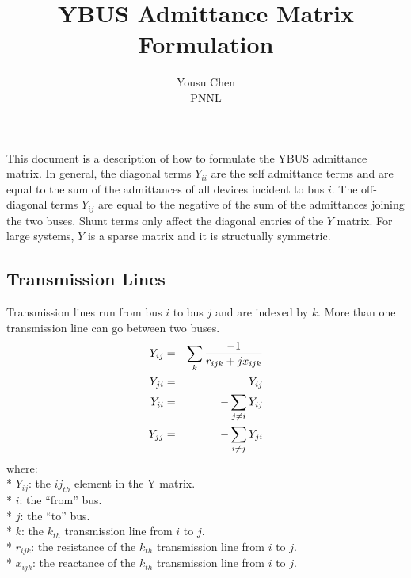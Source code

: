 \documentclass[12pt]{article}
\begin{document}
\title{YBUS Admittance Matrix Formulation}
\author{Yousu Chen \\PNNL}
\maketitle
This document is a description of how to formulate the YBUS admittance matrix.
In general, the diagonal terms $Y_{ii}$ are the self admittance terms and are equal to
the sum of the admittances of all devices incident to bus $i$.  The off-diagonal
terms $Y_{ij}$ are equal to the negative of the sum of the admittances joining
the two buses. Shunt terms only affect the diagonal entries of the $Y$ matrix.
For large systems, $Y$ is a sparse matrix and it is structually symmetric. 

\subsection*{Transmission Lines}
Transmission lines run from bus $i$ to bus $j$ and are indexed by $k$. More than
one transmission line can go between two buses.
\begin{eqnarray}
Y_{ij} &=& \sum_{k}\frac{-1}{r_{ijk}+j\*x_{ijk}} \\
Y_{ji} &=& Y_{ij} \\
Y_{ii} &=& - \sum_{j\ne i} Y_{ij} \\
Y_{jj} &=& - \sum_{i\ne j} Y_{ji}
\end{eqnarray} 
where:\\*
$Y_{ij}$: the ${ij}_{th}$ element in the Y matrix.\\* 
$i$: the ``from'' bus.\\*
$j$: the ``to'' bus. \\*
$k$: the $k_{th}$ transmission line from $i$ to $j$. \\*
$r_{ijk}$: the resistance of the $k_{th}$ transmission line from $i$ to $j$.\\*
$x_{ijk}$: the reactance of the $k_{th}$ transmission line from $i$ to $j$.
\end{document}
